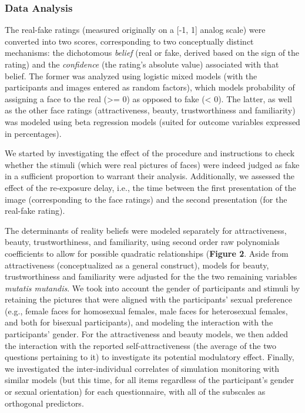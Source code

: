 \documentclass[
  man,floatsintext]{apa6}
\begin{document}
\hypertarget{data-analysis}{%
\subsubsection{Data Analysis}\label{data-analysis}}

The real-fake ratings (measured originally on a {[}-1, 1{]} analog scale) were converted into two scores, corresponding to two conceptually distinct mechanisms: the dichotomous \emph{belief} (real or fake, derived based on the sign of the rating) and the \emph{confidence} (the rating's absolute value) associated with that belief. The former was analyzed using logistic mixed models (with the participants and images entered as random factors), which models probability of assigning a face to the real (\textgreater= 0) as opposed to fake (\textless{} 0). The latter, as well as the other face ratings (attractiveness, beauty, trustworthiness and familiarity) was modeled using beta regression models (suited for outcome variables expressed in percentages).

We started by investigating the effect of the procedure and instructions to check whether the stimuli (which were real pictures of faces) were indeed judged as fake in a sufficient proportion to warrant their analysis. Additionally, we assessed the effect of the re-exposure delay, i.e., the time between the first presentation of the image (corresponding to the face ratings) and the second presentation (for the real-fake rating).

The determinants of reality beliefs were modeled separately for attractiveness, beauty, trustworthiness, and familiarity, using second order raw polynomials coefficients to allow for possible quadratic relationships (\textbf{Figure 2}. Aside from attractiveness (conceptualized as a general construct), models for beauty, trustworthiness and familiarity were adjusted for the the two remaining variables \emph{mutatis mutandis}. We took into account the gender of participants and stimuli by retaining the pictures that were aligned with the participants' sexual preference (e.g., female faces for homosexual females, male faces for heterosexual females, and both for bisexual participants), and modeling the interaction with the participants' gender. For the attractiveness and beauty models, we then added the interaction with the reported self-attractiveness (the average of the two questions pertaining to it) to investigate its potential modulatory effect. Finally, we investigated the inter-individual correlates of simulation monitoring with similar models (but this time, for all items regardless of the participant's gender or sexual orientation) for each questionnaire, with all of the subscales as orthogonal predictors.
\end{document}
